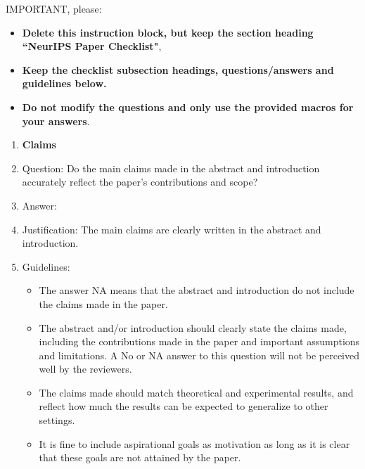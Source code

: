 \documentclass{article}
\begin{document}
IMPORTANT, please:
\begin{itemize}
    \item {\bf Delete this instruction block, but keep the section heading ``NeurIPS Paper Checklist"},
    \item  {\bf Keep the checklist subsection headings, questions/answers and guidelines below.}
    \item {\bf Do not modify the questions and only use the provided macros for your answers}.
\end{itemize} 
 



\begin{enumerate}

\item {\bf Claims}
    \item[] Question: Do the main claims made in the abstract and introduction accurately reflect the paper's contributions and scope?
    \item[] Answer: \answerYes{} %
    \item[] Justification:  The main claims are clearly written in the abstract and introduction.
    \item[] Guidelines:
    \begin{itemize}
        \item The answer NA means that the abstract and introduction do not include the claims made in the paper.
        \item The abstract and/or introduction should clearly state the claims made, including the contributions made in the paper and important assumptions and limitations. A No or NA answer to this question will not be perceived well by the reviewers. 
        \item The claims made should match theoretical and experimental results, and reflect how much the results can be expected to generalize to other settings. 
        \item It is fine to include aspirational goals as motivation as long as it is clear that these goals are not attained by the paper. 
    \end{itemize}


\end{enumerate}
\end{document}

